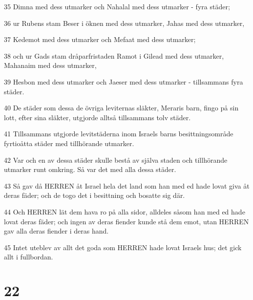 \par 35 Dimna med dess utmarker och Nahalal med dess utmarker - fyra städer;
\par 36 ur Rubens stam Beser i öknen med dess utmarker, Jahas med dess utmarker,
\par 37 Kedemot med dess utmarker och Mefaat med dess utmarker;
\par 38 och ur Gads stam dråparfristaden Ramot i Gilead med dess utmarker, Mahanaim med dess utmarker,
\par 39 Hesbon med dess utmarker och Jaeser med dess utmarker - tillsammans fyra städer.
\par 40 De städer som dessa de övriga leviternas släkter, Meraris barn, fingo på sin lott, efter sina släkter, utgjorde alltså tillsammans tolv städer.
\par 41 Tillsammans utgjorde levitstäderna inom Israels barns besittningsområde fyrtioåtta städer med tillhörande utmarker.
\par 42 Var och en av dessa städer skulle bestå av själva staden och tillhörande utmarker runt omkring. Så var det med alla dessa städer.
\par 43 Så gav då HERREN åt Israel hela det land som han med ed hade lovat giva åt deras fäder; och de togo det i besittning och bosatte sig där.
\par 44 Och HERREN lät dem hava ro på alla sidor, alldeles såsom han med ed hade lovat deras fäder; och ingen av deras fiender kunde stå dem emot, utan HERREN gav alla deras fiender i deras hand.
\par 45 Intet uteblev av allt det goda som HERREN hade lovat Israels hus; det gick allt i fullbordan.

\chapter{22}

